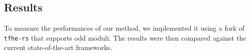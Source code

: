 


\subsection{Results}
To measure the performances of our method, we implemented it using a fork of \texttt{tfhe-rs} \cite{tfhe-rs} that supports odd moduli. The results were then compared against the current state-of-the-art frameworks.

